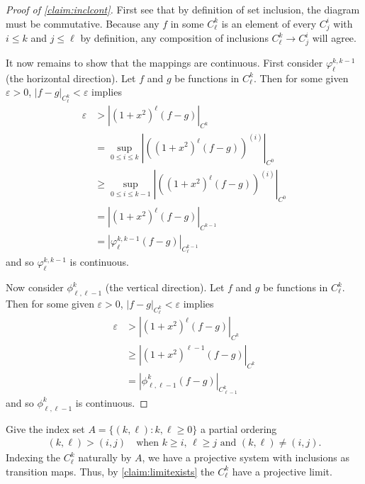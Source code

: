       \begin{proof}[Proof of \cref{claim:inclcont}]
        First see that by definition of set inclusion, the diagram must be commutative.
        Because any $f$ in some $C^k_\ell$ is an element of every $C^i_j$ with $i\le k$ and $j\le\ell$ by definition, any composition of inclusions $C^k_\ell\rightarrow C^i_j$ will agree.

        It now remains to show that the mappings are continuous.
        First consider $\varphi^{k,k-1}_\ell$ (the horizontal direction).
        Let $f$ and $g$ be functions in $C^k_\ell$.
        Then for some given $\varepsilon>0$, $|f-g|_{C^k_\ell}<\varepsilon$ implies
        \begin{align*}
          \varepsilon &> \left|(1+x^2)^\ell(f-g)\right|_{C^k}
          \\&= \sup_{0\le i\le k} \left|((1+x^2)^\ell(f-g))^{(i)}\right|_{C^0}
          \\&\ge \sup_{0\le i\le k-1} \left|((1+x^2)^\ell(f-g))^{(i)}\right|_{C^0} 
          \\&= \left|(1+x^2)^\ell(f-g)\right|_{C^{k-1}}
          \\&= \left|\varphi^{k,k-1}_\ell(f-g)\right|_{C^{k-1}_\ell}
        \end{align*}
        and so $\varphi^{k,k-1}_\ell$ is continuous.

        Now consider $\phi^k_{\ell,\ell-1}$ (the vertical direction).
        Let $f$ and $g$ be functions in $C^k_\ell$.
        Then for some given $\varepsilon>0$, $|f-g|_{C^k_\ell}<\varepsilon$ implies
        \begin{align*}
          \varepsilon &> \left|(1+x^2)^\ell(f-g)\right|_{C^k}
          \\&\ge \left|(1+x^2)^{\ell-1}(f-g)\right|_{C^k}
          \\&= \left|\phi^k_{\ell,\ell-1}(f-g)\right|_{C^k_{\ell-1}}
        \end{align*}
        and so $\phi^k_{\ell,\ell-1}$ is continuous.
      \end{proof}

      Give the index set $A=\{(k,\ell):k,\ell\ge0\}$ a partial ordering
      \begin{align*}
        (k,\ell) > (i,j) \quad\text{when $k\ge i$, $\ell\ge j$ and $(k,\ell) \ne (i,j)$.} 
      \end{align*}
      Indexing the $C^k_\ell$ naturally by $A$, we have a projective system with inclusions as transition maps.
      Thus, by \cref{claim:limitexists} the $C^k_\ell$ have a projective limit.


